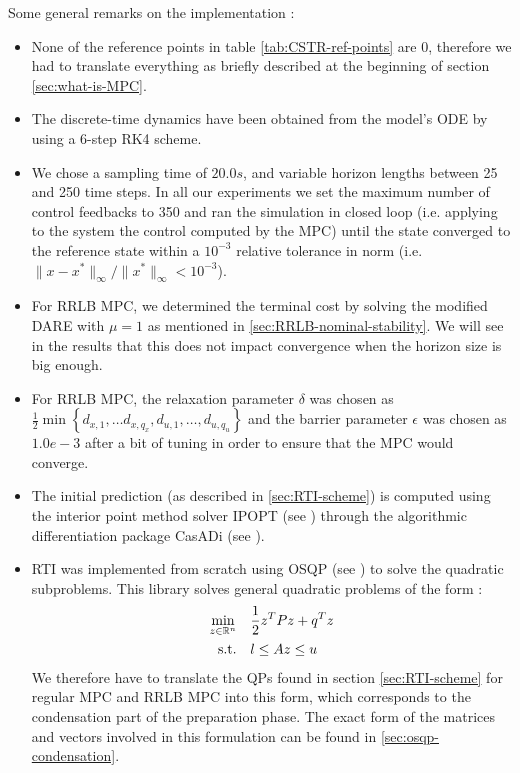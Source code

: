 \documentclass[12pt]{article}
\begin{document}
\noindent Some general remarks on the implementation :
\begin{itemize}[label=\textbullet]
	\item None of the reference points in table \ref{tab:CSTR-ref-points} are 0, therefore we had to translate everything as briefly described at the beginning of section \ref{sec:what-is-MPC}.

	\item The discrete-time dynamics have been obtained from the model's ODE by using a 6-step RK4 scheme.

	\item We chose a sampling time of $20.0s$, and variable horizon lengths between 25 and 250 time steps.
	In all our experiments we set the maximum number of control feedbacks to 350 and ran the simulation in closed loop (i.e. applying to the system the control computed by the MPC) until the state converged to the reference state within a $10^{-3}$ relative tolerance in norm (i.e. $\|x-x^*\|_\infty/\|x^*\|_\infty<10^{-3}$).

	\item For RRLB MPC, we determined the terminal cost by solving the modified DARE with $\mu=1$ as mentioned in \ref{sec:RRLB-nominal-stability}.
	We will see in the results that this does not impact convergence when the horizon size is big enough.

	\item For RRLB MPC, the relaxation parameter $\delta$ was chosen as $\frac{1}{2}\min\left\{ d_{x,1},\dots d_{x,q_x},d_{u,1},\dots,d_{u,q_u} \right\}$ and the barrier parameter $\epsilon$ was chosen as $1.0e-3$ after a bit of tuning in order to ensure that the MPC would converge.

	\item The initial prediction (as described in \ref{sec:RTI-scheme}) is computed using the interior point method solver IPOPT (see \cite{ipopt}) through the algorithmic differentiation package CasADi (see \cite{casadi}).

	\item RTI was implemented from scratch using OSQP (see \cite{osqp}) to solve the quadratic subproblems.
	This library solves general quadratic problems of the form :
	\begin{align*}
		\underset{z\in\mathbb{R}^n}{\min}&\quad\frac{1}{2}z^TPz+q^Tz\\
		\text{s.t.}&\quad l\leq Az\leq u
	\end{align*}
	We therefore have to translate the QPs found in section \ref{sec:RTI-scheme} for regular MPC and RRLB MPC into this form, which corresponds to the condensation part of the preparation phase.
	The exact form of the matrices and vectors involved in this formulation can be found in \ref{sec:osqp-condensation}.


\end{itemize}
\end{document}
